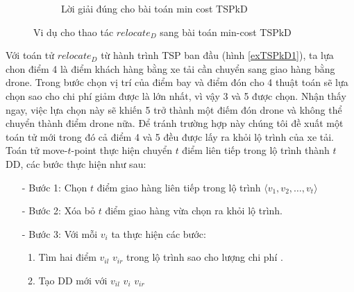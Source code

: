 \documentclass[a4paper,12pt]{report}
\begin{document}
\begin{figure}[H]
\begin{subfigure}{1\textwidth}
\label{exTSPkD3}
\caption{Lời giải đúng cho bài toán min cost \ac{TSPkD}}
\end{subfigure}
\caption{Vi dụ cho thao tác $relocate_D$ sang bài toán min-cost \ac{TSPkD}}\label{exTSPkD}
\end{figure}

Với toán tử $relocate_D$ từ hành trình \ac{TSP} ban đầu (hình \ref{exTSPkD1}), ta lựa chon điểm 4 là điểm khách hàng bằng xe tải cần chuyển sang giao hàng bằng drone. Trong bước chọn vị trí của điểm bay và điểm đón cho 4 thuật toán sẽ lựa chọn sao cho chi phí giảm được là lớn nhất, vì vậy 3 và 5 được chọn. Nhận thấy ngay, việc lựa chọn này sẽ khiến 5 trở thành một điếm đón drone và không thể chuyển thành điểm drone nữa. Để tránh trường hợp này chúng tôi đề xuất một toán tử mới trong đó cả điểm 4 và 5 đều được lấy ra khỏi lộ trình của xe tải. \\

Toán tử move-$t$-point thực hiện chuyển $t$ điểm liên tiếp trong lộ trình thành $t$ DD, các bước thực hiện như sau: 
\begin{itemize}
\item[-] Bước 1: Chọn $t$ điểm giao hàng liên tiếp trong lộ trình $\langle v_1,v_2,\ldots,v_t \rangle$
\item[-] Bước 2: Xóa bỏ $t$ điểm giao hàng vừa chọn ra khỏi lộ trình.
\item[-] Bước 3: Với mỗi $v_i$ ta thực hiện các bước: 
\begin{enumerate}
\item Tìm hai điểm $v_{il}$ $v_{ir}$ trong lộ trình sao cho lượng chi phí .
\item Tạo \ac{DD} mới với $v_{il}$ $v_{i}$ $v_{ir}$
\end{enumerate}
\end{itemize}
\end{document}
